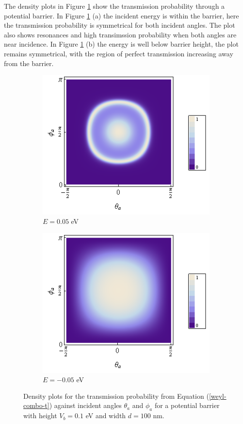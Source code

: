 		The density plots in Figure \ref{weyl-1} show the transmission probability through a potential barrier. In Figure \ref{weyl-1} (a) the incident energy is within the barrier, here the transmission probability is symmetrical for both incident angles. The plot also shows resonances and high transimssion probability when both angles are near incidence. In Figure \ref{weyl-1} (b) the energy is well below barrier height, the plot remains symmetrical, with the region of perfect transmission increasing away from the barrier.
		\begin{figure}[h]
			 \begin{subfigure}[h]{0.5\textwidth}
				\centerline{\includegraphics[scale=0.5]{images/weyl-barrier-phi-theta}}
				\caption{$E=0.05$ eV}
			\end{subfigure}
			\hspace{0.5cm}
			\begin{subfigure}[h]{0.5\textwidth}
				\centerline{\includegraphics[scale=0.5]{images/weyl-barrier-phi-theta-2}}
				\caption{$E=-0.05$ eV}
			\end{subfigure}
			\caption{Density plots for the transmission probability from Equation (\ref{weyl-combo-t}) against incident angles $\theta_{a}$ and $\phi_{a}$ for a potential barrier with height $V_{b}=0.1$ eV and width $d=100$ nm.}
			\label{weyl-1}
		\end{figure}

